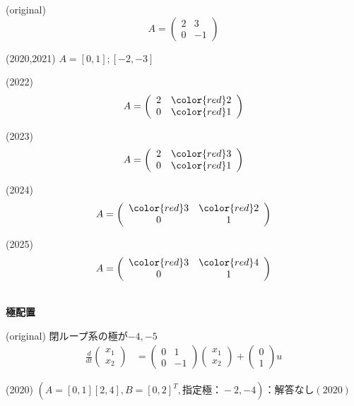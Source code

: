 (original)
\[
	A= \left(\begin{array}{cc}
		2 & 3 \\
		0 & -1
	   \end{array} \right )
\]

(2020,2021) $A=[0,1];[-2,-3]$

(2022)
\[
	A= \left(\begin{array}{cc}
		2 & \color{red} 2 \\
		0 & \color{red} 1
	   \end{array} \right )
\]



(2023)
\[
	A= \left(\begin{array}{cc}
		2 & \color{red} 3 \\
		0 & \color{red} 1
	   \end{array} \right )
\]

(2024)
\[
    A= \left(\begin{array}{cc} \color{red}3 & \color{red}2\\ 0 & 1 \end{array}\right)
\]

(2025)
\[
    A= \left(\begin{array}{cc} \color{red}3 & \color{red}4\\ 0 & 1 \end{array}\right)
\]

\ \\ \noindent
{\bf 極配置}

(original)
閉ループ系の極が$-4,-5$
\begin{align*}
	\frac{d}{dt}
	\left (
	\begin{array}{c}
	 x_1 \\ x_2 
	\end{array}
	\right )
	& = 
	\left (
	\begin{array}{cc}
	 0 & 1 \\
	 0 & -1
	\end{array}
	\right )
	\left (
	\begin{array}{c}
	 x_1 \\ x_2 
	\end{array}
	\right )
	+
	\left (
	\begin{array}{c}
	 0 \\ 1 
	\end{array}
	\right )
	u
\end{align*}

(2020) $(A=[0, 1][2, 4], B=[0, 2]^T, 指定極：-2,-4)：解答なし(2020) $

